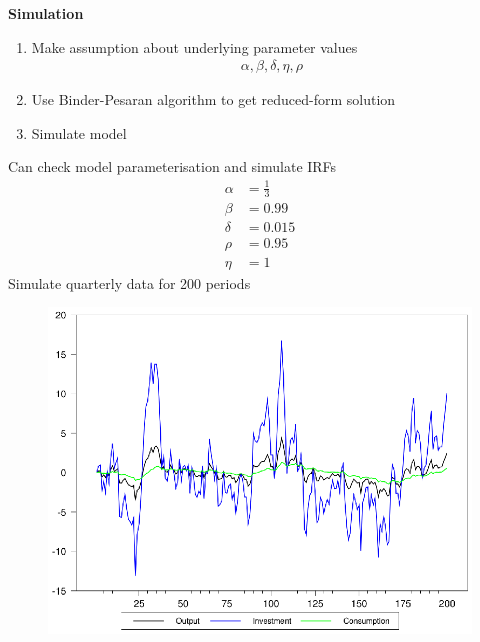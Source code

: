 \documentclass{beamer}
\begin{document}
\begin{frame}
  \textbf{Simulation}  
  \begin{enumerate}
    \item Make assumption about underlying parameter values
    \begin{align*}
      \alpha,\beta,\delta,\eta,\rho
    \end{align*}
    \item Use Binder-Pesaran algorithm to get reduced-form solution
    \item Simulate model
  \end{enumerate} 
\end{frame}

\begin{frame}
  Can check model parameterisation and simulate IRFs
\begin{align}
  \alpha &=\frac{1}{3}\\
  \beta &=0.99\\
  \delta &=0.015\\
  \rho &= 0.95\\
  \eta &= 1
\end{align}
\medskip
Simulate quarterly data for 200 periods
\end{frame}

\begin{frame}
  \begin{figure}
    \includegraphics[scale=.9]{rbc1.eps}
  \end{figure}
\end{frame}
\end{document}
